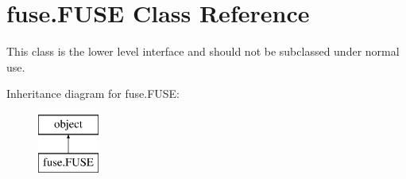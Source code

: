 \hypertarget{classfuse_1_1FUSE}{\section{fuse.\-F\-U\-S\-E Class Reference}
\label{classfuse_1_1FUSE}
}


This class is the lower level interface and should not be subclassed under normal use.  


Inheritance diagram for fuse.\-F\-U\-S\-E\-:\begin{figure}[H]
\begin{center}
\leavevmode
\includegraphics[height=2.000000cm]{classfuse_1_1FUSE}
\end{center}
\end{figure}
